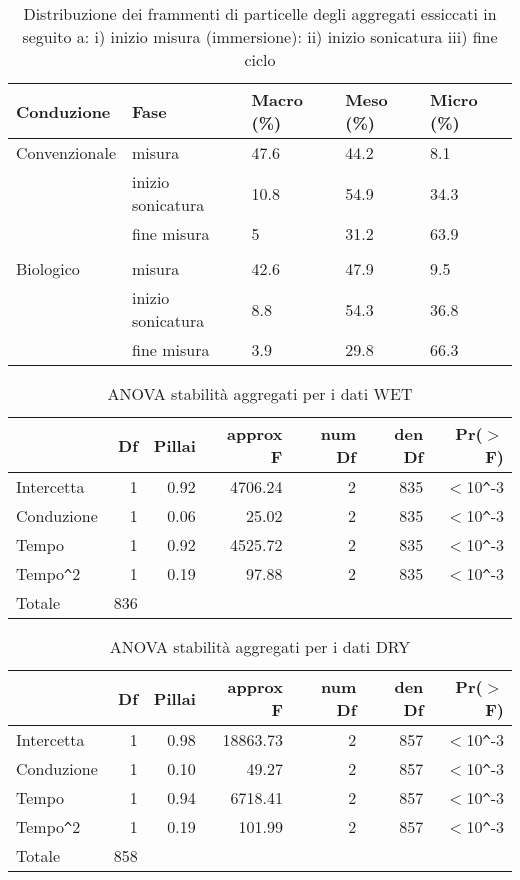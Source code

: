 \documentclass[a4paper]{article}
\begin{document}
\begin{table}[ht]
\centering
\caption{Distribuzione dei frammenti di particelle degli aggregati essiccati in seguito a:
  i) inizio misura (immersione):
  ii) inizio sonicatura
  iii) fine ciclo } 
\label{tab:iufd}
\begin{tabular}{lllll}
  \hline
Conduzione & Fase & Macro (\%) & Meso (\%) & Micro (\%) \\ 
  \hline
Convenzionale & misura & 47.6 & 44.2 & 8.1 \\ 
    & inizio sonicatura & 10.8 & 54.9 & 34.3 \\ 
    & fine misura & 5 & 31.2 & 63.9 \\ 
 \\ 
  Biologico  & misura & 42.6 & 47.9 & 9.5 \\ 
    & inizio sonicatura & 8.8 & 54.3 & 36.8 \\ 
    & fine misura & 3.9 & 29.8 & 66.3 \\ 
   \hline
\end{tabular}
\end{table}
\begin{table}[ht]
\centering
\caption{ANOVA stabilità aggregati per i dati WET } 
\label{tab:anova_compWET}
\begin{tabular}{lrrrrrr}
  \hline
 & Df & Pillai & approx F & num Df & den Df & Pr($>$F) \\ 
  \hline
Intercetta & 1 & 0.92 & 4706.24 & 2 & 835 & $<$10\verb|^|-3 \\ 
  Conduzione & 1 & 0.06 & 25.02 & 2 & 835 & $<$10\verb|^|-3 \\ 
  Tempo & 1 & 0.92 & 4525.72 & 2 & 835 & $<$10\verb|^|-3 \\ 
  Tempo\verb|^|2 & 1 & 0.19 & 97.88 & 2 & 835 & $<$10\verb|^|-3 \\ 
  Totale & 836 &  &  &  &  &  \\ 
   \hline
\end{tabular}
\end{table}


\begin{table}[ht]
\centering
\caption{ANOVA stabilità aggregati per i dati DRY } 
\label{tab:anova_compWET}
\begin{tabular}{lrrrrrr}
  \hline
 & Df & Pillai & approx F & num Df & den Df & Pr($>$F) \\ 
  \hline
Intercetta & 1 & 0.98 & 18863.73 & 2 & 857 & $<$10\verb|^|-3 \\ 
  Conduzione & 1 & 0.10 & 49.27 & 2 & 857 & $<$10\verb|^|-3 \\ 
  Tempo & 1 & 0.94 & 6718.41 & 2 & 857 & $<$10\verb|^|-3 \\ 
  Tempo\verb|^|2 & 1 & 0.19 & 101.99 & 2 & 857 & $<$10\verb|^|-3 \\ 
  Totale & 858 &  &  &  &  &  \\ 
   \hline
\end{tabular}
\end{table}
\end{document}
